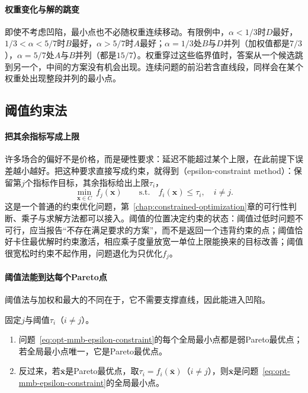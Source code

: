 \paragraph{权重变化与解的跳变}
即使不考虑凹陷，最小点也不必随权重连续移动。有限例中，$\alpha<1/3$时$D$最好，$1/3<\alpha<5/7$时$B$最好，$\alpha>5/7$时$A$最好；$\alpha=1/3$处$B$与$D$并列（加权值都是$7/3$），$\alpha=5/7$处$A$与$B$并列（都是$15/7$）。权重穿过这些临界值时，答案从一个候选跳到另一个，中间的方案没有机会出现。连续问题的前沿若含直线段，同样会在某个权重处出现整段并列的最小点。

\subsection{阈值约束法}
\label{sec:opt-mmb-epsilon-constraint}

\paragraph{把其余指标写成上限}
许多场合的偏好不是价格，而是硬性要求：延迟不能超过某个上限，在此前提下误差越小越好。把这种要求直接写成约束，就得到（epsilon-constraint method）：保留第$j$个指标作目标，其余指标给出上限$\tau_i$，
\begin{equation}
\label{eq:opt-mmb-epsilon-constraint}
\min_{\bm x\in C}\ f_j(\bm x)\qquad\text{s.t.}\quad f_i(\bm x)\leq\tau_i,\quad i\neq j.
\end{equation}
这是一个普通的约束优化问题，第~\ref{chap:constrained-optimization}章的可行性判断、乘子与求解方法都可以接入。阈值的位置决定约束的状态：阈值过低时问题不可行，应当报告“不存在满足要求的方案”，而不是返回一个违背约束的点；阈值恰好卡住最优解时约束激活，相应乘子度量放宽一单位上限能换来的目标改善；阈值很宽松时约束不起作用，问题退化为只优化$f_j$。

\paragraph{阈值法能到达每个Pareto点}
阈值法与加权和最大的不同在于，它不需要支撑直线，因此能进入凹陷。

\begin{theorem}[阈值约束问题的解]
\label{thm:opt-mmb-epsilon-constraint}
固定$j$与阈值$\tau_i$（$i\neq j$）。
\begin{enumerate}
  \item 问题~\eqref{eq:opt-mmb-epsilon-constraint}的每个全局最小点都是弱Pareto最优点；若全局最小点唯一，它是Pareto最优点。
  \item 反过来，若$\bar{\bm x}$是Pareto最优点，取$\tau_i=f_i(\bar{\bm x})$（$i\neq j$），则$\bar{\bm x}$是问题~\eqref{eq:opt-mmb-epsilon-constraint}的全局最小点。
\end{enumerate}
\end{theorem}

